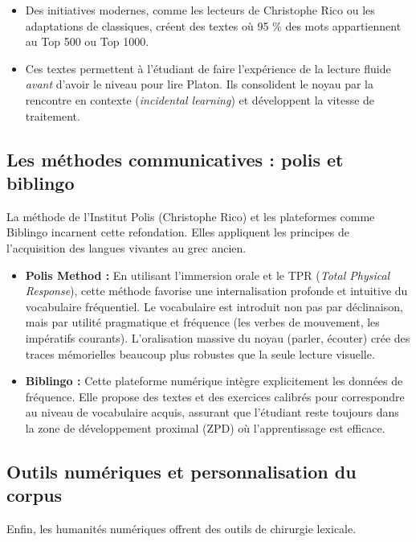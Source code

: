 {\begin{itemize}\item Des initiatives modernes, comme les lecteurs de Christophe Rico ou les adaptations de classiques, créent des textes où 95 \% des mots appartiennent au Top 500 ou Top 1000.\cite{III-1-1-ref44}\item Ces textes permettent à l'étudiant de faire l'expérience de la lecture fluide \textit{avant} d'avoir le niveau pour lire Platon. Ils consolident le noyau par la rencontre en contexte (\textit{incidental learning}) et développent la vitesse de traitement.\cite{III-1-1-ref56}\end{itemize}

\subsection{Les méthodes communicatives : polis et biblingo}

La méthode de l'Institut Polis (Christophe Rico) et les plateformes comme Biblingo incarnent cette
refondation. Elles appliquent les principes de l'acquisition des langues vivantes au grec ancien.

\begin{itemize}\item \textbf{Polis Method :} En utilisant l'immersion orale et le TPR (\textit{Total Physical Response}), cette méthode favorise une internalisation profonde et intuitive du vocabulaire fréquentiel. Le vocabulaire est introduit non pas par déclinaison, mais par utilité pragmatique et fréquence (les verbes de mouvement, les impératifs courants). L'oralisation massive du noyau (parler, écouter) crée des traces mémorielles beaucoup plus robustes que la seule lecture visuelle.\cite{III-1-1-ref57}\item \textbf{Biblingo :} Cette plateforme numérique intègre explicitement les données de fréquence. Elle propose des textes et des exercices calibrés pour correspondre au niveau de vocabulaire acquis, assurant que l'étudiant reste toujours dans la zone de développement proximal (ZPD) où l'apprentissage est efficace.\cite{III-1-1-ref60}\end{itemize}

\subsection{Outils numériques et personnalisation du corpus}

Enfin, les humanités numériques offrent des outils de \og chirurgie\fg{} lexicale.

}

